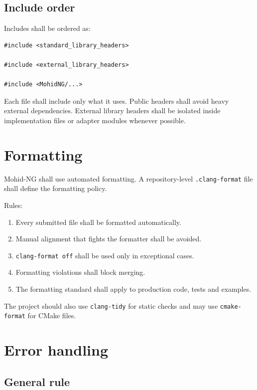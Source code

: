 \documentclass[11pt,a4paper]{article}
\newcommand{\code}[1]{\texttt{#1}}
\begin{document}
\subsection{Include order}

Includes shall be ordered as:

\begin{lstlisting}[style=mohidcpp]
#include <standard_library_headers>

#include <external_library_headers>

#include <MohidNG/...>
\end{lstlisting}

Each file shall include only what it uses. Public headers shall avoid heavy external dependencies. External library headers shall be isolated inside implementation files or adapter modules whenever possible.

\section{Formatting}

Mohid-NG shall use automated formatting. A repository-level \code{.clang-format} file shall define the formatting policy.

Rules:

\begin{enumerate}
  \item Every submitted file shall be formatted automatically.
  \item Manual alignment that fights the formatter shall be avoided.
  \item \code{clang-format off} shall be used only in exceptional cases.
  \item Formatting violations shall block merging.
  \item The formatting standard shall apply to production code, tests and examples.
\end{enumerate}

The project should also use \code{clang-tidy} for static checks and may use \code{cmake-format} for CMake files.

\section{Error handling}

\subsection{General rule}
\end{document}
